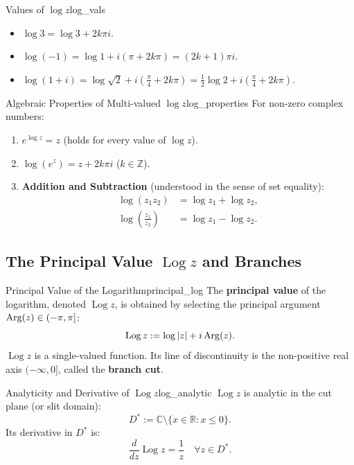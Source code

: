 \begin{example}{Values of $\log z$}{log_vals}
\begin{itemize}
    \item $\log 3 = \log 3 + 2k\pi i$.
    \item $\log(-1) = \log 1 + i(\pi + 2k\pi) = (2k + 1)\pi i$.
    \item $\log(1 + i) = \log\sqrt{2} + i\left(\frac{\pi}{4} + 2k\pi\right) = \frac{1}{2}\log 2 + i\left(\frac{\pi}{4} + 2k\pi\right)$.
\end{itemize}
\end{example}

\begin{proposition}{Algebraic Properties of Multi-valued $\log z$}{log_properties}
For non-zero complex numbers:
\begin{enumerate}
    \item $e^{\log z} = z$ (holds for every value of $\log z$).
    \item $\log(e^z) = z + 2k\pi i$ ($k \in \mathbb{Z}$).
    \item \textbf{Addition and Subtraction} (understood in the sense of set equality):
    \begin{align}
    \log(z_1 z_2) &= \log z_1 + \log z_2, \\
    \log\left(\frac{z_1}{z_2}\right) &= \log z_1 - \log z_2.
    \end{align}
\end{enumerate}
\end{proposition}

\subsection{The Principal Value \texorpdfstring{$\operatorname{Log} z$}{Log z} and Branches}

\begin{definition}{Principal Value of the Logarithm}{principal_log}
The \textbf{principal value} of the logarithm, denoted $\operatorname{Log} z$, is obtained by selecting the principal argument $\operatorname{Arg}(z) \in (-\pi, \pi]$:
\begin{equation}
\operatorname{Log} z := \log|z| + i \operatorname{Arg}(z).
\end{equation}
$\operatorname{Log} z$ is a single-valued function. Its line of discontinuity is the non-positive real axis $(-\infty, 0]$, called the \textbf{branch cut}.
\end{definition}

\begin{theorem}{Analyticity and Derivative of $\operatorname{Log} z$}{log_analytic}
$\operatorname{Log} z$ is analytic in the cut plane (or slit domain):
\begin{equation}
D^* := \mathbb{C} \setminus \{x \in \mathbb{R} : x \le 0\}.
\end{equation}
Its derivative in $D^*$ is:
\begin{equation}
\frac{d}{dz} \operatorname{Log} z = \frac{1}{z} \quad \forall z \in D^*.
\end{equation}
\end{theorem}

